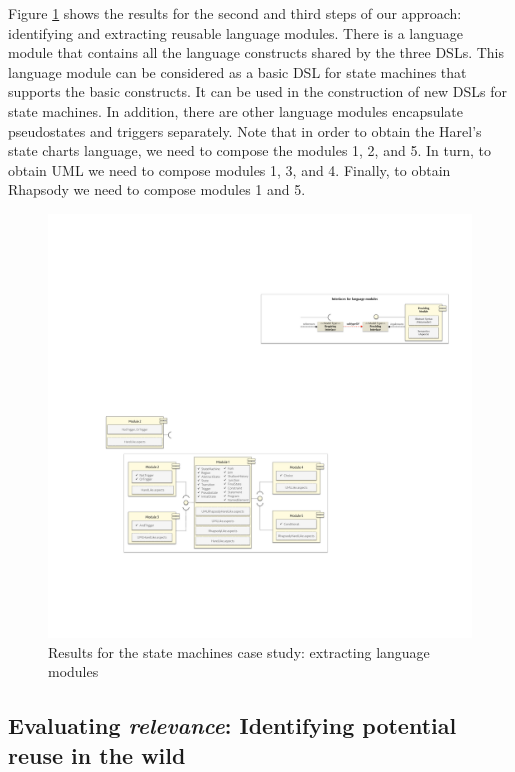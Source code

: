 Figure \ref{fig:puzzle-modularization} shows the results for the second and third steps of our approach: identifying and extracting reusable language modules. There is a language module that contains all the language constructs shared by the three DSLs. This language module can be considered as a basic DSL for state machines that supports the basic constructs. It can be used in the construction of new DSLs for state machines. In addition, there are other language modules encapsulate pseudostates and triggers separately. Note that in order to obtain the Harel's state charts language, we need to compose the modules 1, 2, and 5. In turn, to obtain UML we need to compose modules 1, 3, and 4. Finally, to obtain Rhapsody we need to compose modules 1 and 5.

\begin{figure}[h!]
\centering
\includegraphics[width=1\linewidth]{images/puzzle-modularization.pdf}
\caption{Results for the state machines case study: extracting language modules}
\label{fig:puzzle-modularization}
\end{figure}

\subsection{Evaluating \textit{relevance}: Identifying potential reuse in the wild}

